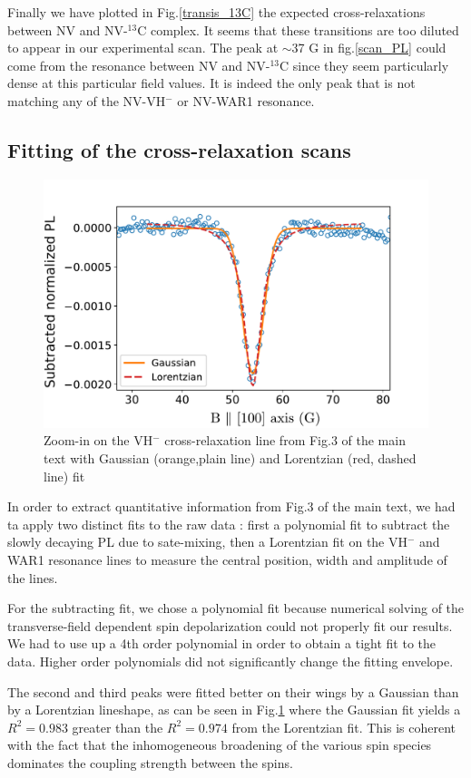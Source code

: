 \documentclass[9pt,twocolumn,twoside]{revtex4-1}
\begin{document}
Finally we have plotted in Fig.\ref{transis_13C} the expected cross-relaxations between NV and NV-$^{13}$C complex. It seems that these transitions are too diluted to appear in our experimental scan. The peak at $\sim$37 G in fig.\ref{scan_PL} could come from the resonance between NV and NV-$^{13}$C since they seem particularly dense at this particular field values.
It is indeed  the only peak that is not matching any of the NV-VH$^-$ or NV-WAR1 resonance.

\subsection{Fitting of the cross-relaxation scans}
\begin{figure}
\includegraphics[scale=0.5]{Gauss_vs_Lor_VH}
\caption{Zoom-in on the VH$^-$ cross-relaxation line from Fig.3 of the main text with Gaussian (orange,plain line) and Lorentzian (red, dashed line) fit}
\label{Gauss_vs_Lor}
\end{figure}
In order to extract quantitative information from Fig.3 of the main text, we had ta apply two distinct fits to the raw data : first a polynomial fit to subtract the slowly decaying PL due to sate-mixing, then a Lorentzian fit on the VH$^-$ and WAR1 resonance lines to measure the central position, width and amplitude of the lines.

For the subtracting fit, we chose a polynomial fit because numerical solving of the transverse-field dependent spin depolarization could not properly fit our results. We had to use up a 4th order polynomial in order to obtain a tight fit to the data. Higher order polynomials did not significantly change the fitting envelope.

The second and third peaks were fitted better on their wings by a Gaussian than by a Lorentzian lineshape, as can be seen in Fig.\ref{Gauss_vs_Lor} where the Gaussian fit yields a $R^2=0.983$ greater than the $R^2=0.974$ from the Lorentzian fit. This is coherent with the fact that the inhomogeneous broadening of the various spin species dominates the coupling strength between the spins.
\end{document}

